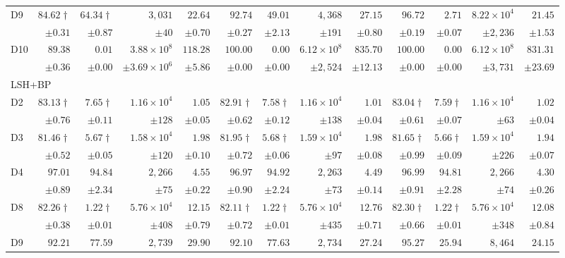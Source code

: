 \begin{table}[t]
{\begin{tabular}{lrrrrrrrrrrrr}
D9 & $84.62\dagger$ & $64.34\dagger$ & $3{,}031$ & $22.64$ & $92.74$ & $49.01$ & $4{,}368$ & $27.15$ & $96.72$ & $2.71$ & $8.22\times 10^{4}$ & $21.45$ \\
 & $\pm 0.31$ & $\pm 0.87$ & $\pm 40$ & $\pm 0.70$ & $\pm 0.27$ & $\pm 2.13$ & $\pm 191$ & $\pm 0.80$ & $\pm 0.19$ & $\pm 0.07$ & $\pm 2{,}236$ & $\pm 1.53$ \\
D10 & $89.38$ & $0.01$ & $3.88\times 10^{8}$ & $118.28$ & $100.00$ & $0.00$ & $6.12\times 10^{8}$ & $835.70$ & $100.00$ & $0.00$ & $6.12\times 10^{8}$ & $831.31$ \\
 & $\pm 0.36$ & $\pm 0.00$ & $\pm 3.69\times 10^{6}$ & $\pm 5.86$ & $\pm 0.00$ & $\pm 0.00$ & $\pm 2{,}524$ & $\pm 12.13$ & $\pm 0.00$ & $\pm 0.00$ & $\pm 3{,}731$ & $\pm 23.69$ \\
\midrule
\multicolumn{13}{l}{\textsc{LSH+BP}} \\
\midrule
D2 & $83.13\dagger$ & $7.65\dagger$ & $1.16\times 10^{4}$ & $1.05$ & $82.91\dagger$ & $7.58\dagger$ & $1.16\times 10^{4}$ & $1.01$ & $83.04\dagger$ & $7.59\dagger$ & $1.16\times 10^{4}$ & $1.02$ \\
 & $\pm 0.76$ & $\pm 0.11$ & $\pm 128$ & $\pm 0.05$ & $\pm 0.62$ & $\pm 0.12$ & $\pm 138$ & $\pm 0.04$ & $\pm 0.61$ & $\pm 0.07$ & $\pm 63$ & $\pm 0.04$ \\
D3 & $81.46\dagger$ & $5.67\dagger$ & $1.58\times 10^{4}$ & $1.98$ & $81.95\dagger$ & $5.68\dagger$ & $1.59\times 10^{4}$ & $1.98$ & $81.65\dagger$ & $5.66\dagger$ & $1.59\times 10^{4}$ & $1.94$ \\
 & $\pm 0.52$ & $\pm 0.05$ & $\pm 120$ & $\pm 0.10$ & $\pm 0.72$ & $\pm 0.06$ & $\pm 97$ & $\pm 0.08$ & $\pm 0.99$ & $\pm 0.09$ & $\pm 226$ & $\pm 0.07$ \\
D4 & $97.01$ & $94.84$ & $2{,}266$ & $4.55$ & $96.97$ & $94.92$ & $2{,}263$ & $4.49$ & $96.99$ & $94.81$ & $2{,}266$ & $4.30$ \\
 & $\pm 0.89$ & $\pm 2.34$ & $\pm 75$ & $\pm 0.22$ & $\pm 0.90$ & $\pm 2.24$ & $\pm 73$ & $\pm 0.14$ & $\pm 0.91$ & $\pm 2.28$ & $\pm 74$ & $\pm 0.26$ \\
D8 & $82.26\dagger$ & $1.22\dagger$ & $5.76\times 10^{4}$ & $12.15$ & $82.11\dagger$ & $1.22\dagger$ & $5.76\times 10^{4}$ & $12.76$ & $82.30\dagger$ & $1.22\dagger$ & $5.76\times 10^{4}$ & $12.08$ \\
 & $\pm 0.38$ & $\pm 0.01$ & $\pm 408$ & $\pm 0.79$ & $\pm 0.72$ & $\pm 0.01$ & $\pm 435$ & $\pm 0.71$ & $\pm 0.66$ & $\pm 0.01$ & $\pm 348$ & $\pm 0.84$ \\
D9 & $92.21$ & $77.59$ & $2{,}739$ & $29.90$ & $92.10$ & $77.63$ & $2{,}734$ & $27.24$ & $95.27$ & $25.94$ & $8{,}464$ & $24.15$ \\

\end{tabular}}
\end{table}
